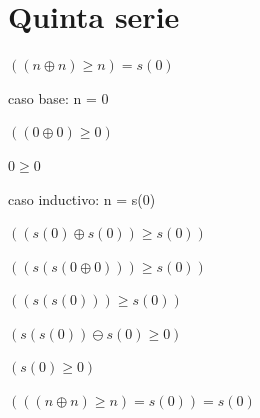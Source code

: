 \documentclass{article}
\begin{document}
\section{Quinta serie}
$((n \oplus n) \geq n) = s(0)$
\begin{center}
    caso base: n = 0
\end{center}
\begin{center}
    $((0 \oplus 0) \geq 0)$
\end{center}
\begin{center}
    $0 \geq 0$
\end{center}
\begin{center}
    caso inductivo: n = s(0)
\end{center}
\begin{center}
    $((s(0) \oplus s(0)) \geq s(0))$
\end{center}
\begin{center}
    $((s(s(0 \oplus 0))) \geq s(0))$
\end{center}
\begin{center}
    $((s(s(0))) \geq s(0))$
\end{center}
\begin{center}
    $(s(s(0)) \ominus s(0) \geq 0)$
\end{center}
\begin{center}
    $(s(0) \geq 0)$
\end{center}
\begin{center}
    $(((n \oplus n) \geq n) = s(0)) = s(0)$
\end{center}
\end{document}
